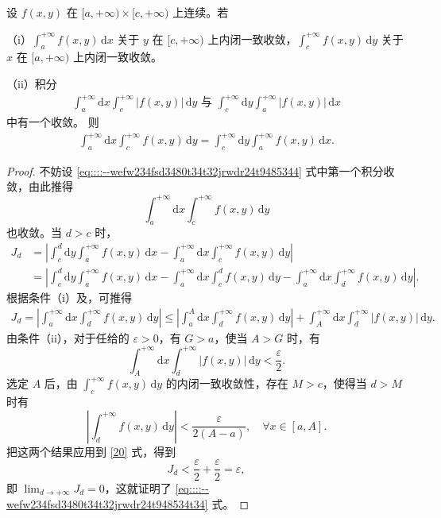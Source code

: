\documentclass[../../main.tex]{subfiles}
\begin{document}
\begin{theorem}
设 \( f(x,y) \) 在 \( [a, +\infty) \times [c, +\infty) \) 上连续。若

（i）\( \int_{a}^{+\infty} f(x,y) \, \mathrm{d}x \) 关于 \( y \) 在 \( [c, +\infty) \) 上内闭一致收敛，\( \int_{c}^{+\infty} f(x,y) \, \mathrm{d}y \) 关于 \( x \) 在 \( [a, +\infty) \) 上内闭一致收敛。

（ii）积分
\begin{align}\label{eq::::--wefw234fsd3480t34t32jrwdr24t9485344}
\int_{a}^{+\infty} \mathrm{d}x \int_{c}^{+\infty} |f(x,y)| \, \mathrm{d}y \text{ 与 } \int_{c}^{+\infty} \mathrm{d}y \int_{a}^{+\infty} |f(x,y)| \, \mathrm{d}x
\end{align}
中有一个收敛。
则
\begin{align}\label{eq::::--wefw234fsd3480t34t32jrwdr24t948534t34}
\int_{a}^{+\infty} \mathrm{d}x \int_{c}^{+\infty} f(x,y) \, \mathrm{d}y = \int_{c}^{+\infty} \mathrm{d}y \int_{a}^{+\infty} f(x,y) \, \mathrm{d}x.
\end{align}
\end{theorem}
\begin{proof}
不妨设 \eqref{eq::::--wefw234fsd3480t34t32jrwdr24t9485344} 式中第一个积分收敛，由此推得
\[
\int_{a}^{+\infty} \mathrm{d}x \int_{c}^{+\infty} f(x,y) \, \mathrm{d}y
\]
也收敛。当 \( d > c \) 时，
\begin{align*}
J_d &= \left| \int_{c}^{d} \mathrm{d}y \int_{a}^{+\infty} f(x,y) \, \mathrm{d}x - \int_{a}^{+\infty} \mathrm{d}x \int_{c}^{+\infty} f(x,y) \, \mathrm{d}y \right| \\
&= \left| \int_{c}^{d} \mathrm{d}y \int_{a}^{+\infty} f(x,y) \, \mathrm{d}x - \int_{a}^{+\infty} \mathrm{d}x \int_{c}^{d} f(x,y) \, \mathrm{d}y - \int_{a}^{+\infty} \mathrm{d}x \int_{d}^{+\infty} f(x,y) \, \mathrm{d}y \right|.
\end{align*}
根据条件（i）及，可推得
\begin{align}\label{20}
J_d = \left| \int_{a}^{+\infty} \mathrm{d}x \int_{d}^{+\infty} f(x,y) \, \mathrm{d}y \right| \leqslant \left| \int_{a}^{A} \mathrm{d}x \int_{d}^{+\infty} f(x,y) \, \mathrm{d}y \right| + \int_{A}^{+\infty} \mathrm{d}x \int_{d}^{+\infty} |f(x,y)| \, \mathrm{d}y.
\end{align}
由条件（ii），对于任给的 \( \varepsilon > 0 \)，有 \( G > a \)，使当 \( A > G \) 时，有
\[
\int_{A}^{+\infty} \mathrm{d}x \int_{d}^{+\infty} |f(x,y)| \, \mathrm{d}y < \frac{\varepsilon}{2}.
\]
选定 \( A \) 后，由 \( \int_{c}^{+\infty} f(x,y) \, \mathrm{d}y \) 的内闭一致收敛性，存在 \( M > c \)，使得当 \( d > M \) 时有
\[
\left| \int_{d}^{+\infty} f(x,y) \, \mathrm{d}y \right| < \frac{\varepsilon}{2(A - a)}, \quad \forall x \in [a,A].
\]
把这两个结果应用到 \eqref{20} 式，得到
\[
J_d < \frac{\varepsilon}{2} + \frac{\varepsilon}{2} = \varepsilon,
\]
即 \( \lim_{d \to +\infty} J_d = 0 \)，这就证明了 \eqref{eq::::--wefw234fsd3480t34t32jrwdr24t948534t34} 式。

\end{proof}
\end{document}
